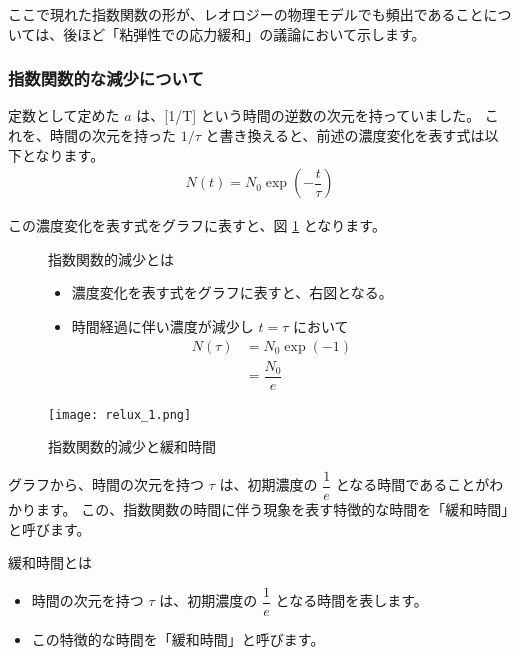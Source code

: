 \documentclass[uplatex,dvipdfmx,a4paper,11pt]{jsarticle}
\begin{document}
ここで現れた指数関数の形が、レオロジーの物理モデルでも頻出であることについては、後ほど「粘弾性での応力緩和」の議論において示します。

\subsubsection{指数関数的な減少について}

定数として定めた $a$ は、[1/T] という時間の逆数の次元を持っていました。
これを、時間の次元を持った $1/\tau$ と書き換えると、前述の濃度変化を表す式は以下となります。
\begin{align*}
	N(t) = N_0 \exp \left(-\dfrac{t}{\tau} \right)
\end{align*}

この濃度変化を表す式をグラフに表すと、図 \ref{fig:exp_kanwa} となります。
\begin{figure}[htb]
	\begin{center}
		\begin{minipage}{0.45\textwidth}
			\large
			\begin{itembox}[l]{指数関数的減少とは}
				\begin{itemize}
					\item 濃度変化を表す式をグラフに表すと、右図となる。
					\item 時間経過に伴い濃度が減少し $t = \tau$ において
					\begin{align*}
						N(\tau) 
						&= N_0 \exp(-1)\\ 
						&= \dfrac{N_0}{e}
					\end{align*}
				\end{itemize}
			\end{itembox}
		\end{minipage}
		\begin{minipage}{0.45\textwidth}
			\begin{center}
			\texttt{[image: relux\_1.png]}
			\end{center}
		\end{minipage}
		\caption{指数関数的減少と緩和時間}
		\label{fig:exp_kanwa}
	\end{center}
\end{figure}

グラフから、時間の次元を持つ $\tau$ は、初期濃度の $\dfrac{1}{e}$ となる時間であることがわかります。
この、指数関数の時間に伴う現象を表す特徴的な時間を「緩和時間」と呼びます。
\large
	\begin{itembox}[l]{緩和時間とは}
		\begin{itemize}
			\item 時間の次元を持つ $\tau$ は、初期濃度の $\dfrac{1}{e}$ となる時間を表します。
			\item この特徴的な時間を「緩和時間」と呼びます。
		\end{itemize}
	\end{itembox}	
\normalsize
\end{document}
